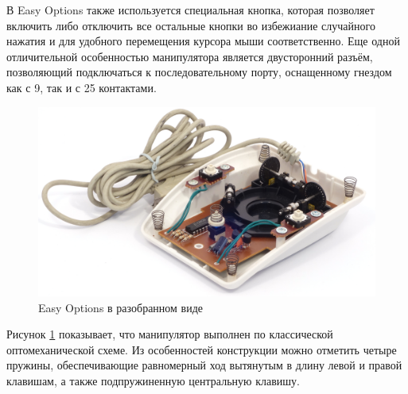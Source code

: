 \documentclass[11pt, a4paper]{article}
\begin{document}
В Easy Options также используется специальная кнопка, которая позволяет включить либо отключить все остальные кнопки во избежиание случайного нажатия и для удобного перемещения курсора мыши соответственно. Еще одной отличительной особенностью манипулятора является двусторонний разъём, позволяющий подключаться к последовательному порту, оснащенному гнездом как с 9, так и с 25 контактами.

\begin{figure}[h]
    \centering
    \includegraphics[scale=0.6]{1993_easy_options_trackball/inside_60.jpg}
    \caption{Easy Options в разобранном виде}
    \label{fig:EasyOptionsInside}
\end{figure}

Рисунок \ref{fig:EasyOptionsInside} показывает, что манипулятор выполнен по классической оптомеханической схеме. Из особенностей конструкции можно отметить четыре пружины, обеспечивающие равномерный ход вытянутым в длину левой и правой клавишам, а также подпружиненную центральную клавишу.
\end{document}
